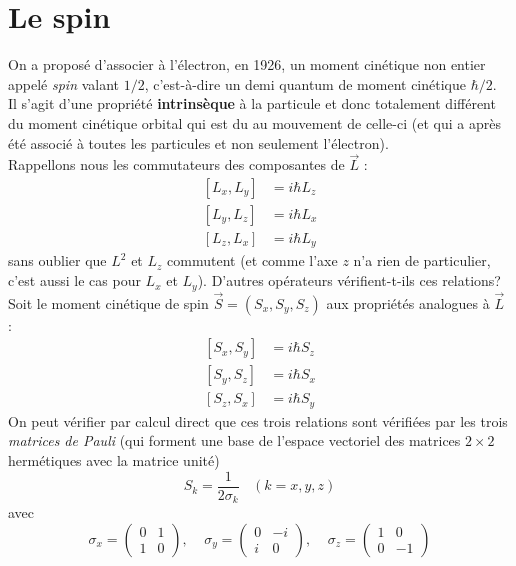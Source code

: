 \documentclass	[11pt, a4paper, openany]{book}
\begin{document}
	\section{Le spin}
	On a proposé d'associer à l'électron, en 1926, un moment cinétique non entier appelé
	\textit{spin} valant $1/2$, c'est-à-dire un demi quantum de moment cinétique $\hbar/
	2$.\\
	Il s'agit d'une propriété \textbf{intrinsèque} à la particule et donc totalement 
	différent du moment cinétique orbital qui est du au mouvement de celle-ci (et qui 
	a après été associé à toutes les particules et non seulement l'électron).\\
	Rappellons nous les commutateurs des composantes de $\vec{L}$ :
	\begin{equation}
	\begin{array}{ll}
	[L_x,L_y] &= i\hbar L_z\\
	\left[L_y,L_z\right] &= i\hbar L_x\\
	\left[L_z,L_x\right] &= i\hbar L_y
	\end{array}
	\end{equation}
	sans oublier que $L^2$ et $L_z$ commutent (et comme l'axe $z$ n'a rien de particulier,
	c'est aussi le cas pour $L_x$ et $L_y$). D'autres opérateurs vérifient-t-ils ces 
	relations? \\
	Soit le moment cinétique de spin $\vec{S} = (S_x,S_y,S_z)$ aux propriétés analogues
	à $\vec{L}$ :
	\begin{equation}
	\begin{array}{cc}
	[S_x,S_y] &= i\hbar S_z\\
	\left[S_y,S_z\right] &= i\hbar S_x\\
	\left[S_z,S_x\right] &= i\hbar S_y
	\end{array}
	\end{equation}
	On peut vérifier par calcul direct que ces trois relations sont vérifiées par les 
	trois \textit{matrices de Pauli} (qui forment une base de l'espace vectoriel des 
	matrices $2\times2$ hermétiques avec la matrice unité)
	\begin{equation}
	S_k = \frac{1}{2\sigma_k}\ \ \ \ (k=x,y,z)
	\end{equation}
	avec
	\begin{equation}
	\sigma_x = \left(\begin{array}{cc}
	0 & 1\\
	1 & 0
	\end{array}\right),\ \ \ \ \ \sigma_y =	\left(\begin{array}{cc}
	0 & -i\\
	i & 0
	\end{array}\right),\ \ \ \ \ \sigma_z =	\left(\begin{array}{cc}
	1 & 0\\
	0 & -1
	\end{array}\right)
	\end{equation}
\end{document}
